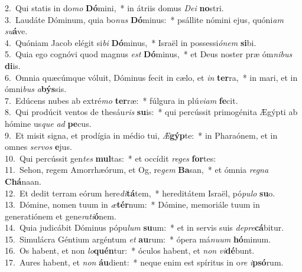 {2.~}Qui statis in do\textit{mo} \textbf{Dó}mini,~* in átriis domus \textit{De}\textit{i} \textbf{no}stri.\\
{3.~}Laudáte Dóminum, quia bo\textit{nus} \textbf{Dó}minus:~* psállite nómini ejus, quóni\textit{am} \textit{su}\textbf{á}ve.\\
{4.~}Quóniam Jacob elégit si\textit{bi} \textbf{Dó}minus,~* Israël in possessi\textit{ó}\textit{nem} \textbf{si}bi.\\
{5.~}Quia ego cognóvi quod magnus \textit{est} \textbf{Dó}minus,~* et Deus noster præ óm\textit{ni}\textit{bus} \textbf{di}is.\\
{6.~}Omnia quæcúmque vóluit, Dóminus fecit in cælo, et \textit{in} \textbf{ter}ra,~* in mari, et in ómni\textit{bus} \textit{a}\textbf{býs}sis.\\
{7.~}Edúcens nubes ab extré\textit{mo} \textbf{ter}ræ:~* fúlgura in plú\textit{vi}\textit{am} \textbf{fe}cit.\\
{8.~}Qui prodúcit ventos de thesáu\textit{ris} \textbf{su}is:~* qui percússit primogénita Ægýpti ab hómine us\textit{que} \textit{ad} \textbf{pe}cus.\\
{9.~}Et misit signa, et prodígia in médio tui, \textit{Æ}\textbf{gýp}te:~* in Pharaónem, et in omnes \textit{ser}\textit{vos} \textbf{e}jus.\\
{10.~}Qui percússit gen\textit{tes} \textbf{mul}tas:~* et occídit \textit{re}\textit{ges} \textbf{for}tes:\\
{11.~}Sehon, regem Amorrhæórum, et Og, re\textit{gem} \textbf{Ba}san,~* et ómnia \textit{re}\textit{gna} \textbf{Chá}naan.\\
{12.~}Et dedit terram eórum here\textit{di}\textbf{tá}tem,~* hereditátem Israël, pó\textit{pu}\textit{lo} \textbf{su}o.\\
{13.~}Dómine, nomen tuum in \textit{æ}\textbf{tér}num:~* Dómine, memoriále tuum in generatiónem et gene\textit{ra}\textit{ti}\textbf{ó}nem.\\
{14.~}Quia judicábit Dóminus pópu\textit{lum} \textbf{su}um:~* et in servis suis \textit{de}\textit{pre}\textbf{cá}bitur.\\
{15.~}Simulácra Géntium argéntum \textit{et} \textbf{au}rum:~* ópera má\textit{nu}\textit{um} \textbf{hó}minum.\\
{16.~}Os habent, et non \textit{lo}\textbf{quén}tur:~* óculos habent, et \textit{non} \textit{vi}\textbf{dé}bunt.\\
{17.~}Aures habent, et \textit{non} \textbf{áu}dient:~* neque enim est spíritus in o\textit{re} \textit{i}\textbf{psó}rum.\\
